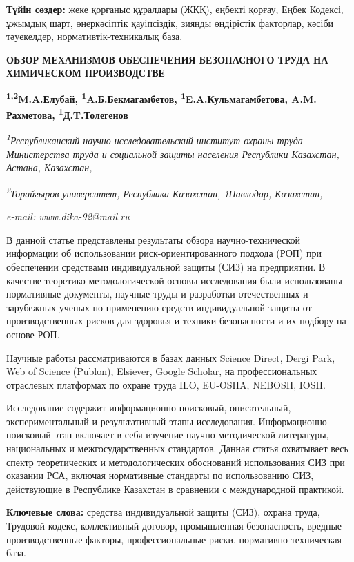 {{\bfseries Түйін сөздер:} жеке қорғаныс құралдары (ЖҚҚ), еңбекті қорғау,
Еңбек Кодексі, ұжымдық шарт, өнеркәсіптік қауіпсіздік, зиянды өндірістік
факторлар, кәсіби тәуекелдер, нормативтік-техникалық база.

{\bfseries ОБЗОР МЕХАНИЗМОВ ОБЕСПЕЧЕНИЯ БЕЗОПАСНОГО ТРУДА НА ХИМИЧЕСКОМ
ПРОИЗВОДСТВЕ}

{\bfseries \textsuperscript{1,2}M.A.Елубай,
\textsuperscript{1}A.Б.Бекмагамбетов,
\textsuperscript{1}E.A.Кульмагамбетова, A.M. Рахметова,
\textsuperscript{1}Д.T.Толегенов\textsuperscript{\envelope }}

\emph{\textsuperscript{1}Республиканский научно-исследовательский
институт охраны труда Министерства труда и социальной защиты населения
Республики Казахстан, Астана, Казахстан,}

\emph{\textsuperscript{2}Торайгыров университет, Республика Казахстан,
1Павлодар, Казахстан,}

\emph{e-mail: www.dika-92@mail.ru}

В данной статье представлены результаты обзора научно-технической
информации об использовании риск-ориентированного подхода (РОП) при
обеспечении средствами индивидуальной защиты (СИЗ) на предприятии. В
качестве теоретико-методологической основы исследования были
использованы нормативные документы, научные труды и разработки
отечественных и зарубежных ученых по применению средств индивидуальной
защиты от производственных рисков для здоровья и техники безопасности и
их подбору на основе РОП.

Научные работы рассматриваются в базах данных Science Direct, Dergi
Park, Web of Science (Publon), Elsiever, Google Scholar, на
профессиональных отраслевых платформах по охране труда ILO, EU-OSHA,
NEBOSH, IOSH.

Исследование содержит информационно-поисковый, описательный,
экспериментальный и результативный этапы исследования.
Информационно-поисковый этап включает в себя изучение
научно-методической литературы, национальных и межгосударственных
стандартов. Данная статья охватывает весь спектр теоретических и
методологических обоснований использования СИЗ при оказании РСА, включая
нормативные стандарты по использованию СИЗ, действующие в Республике
Казахстан в сравнении с международной практикой.

{\bfseries Ключевые слова:} средства индивидуальной защиты (СИЗ), охрана
труда, Трудовой кодекс, коллективный договор, промышленная безопасность,
вредные производственные факторы, профессиональные риски,
нормативно-техническая база.

}
